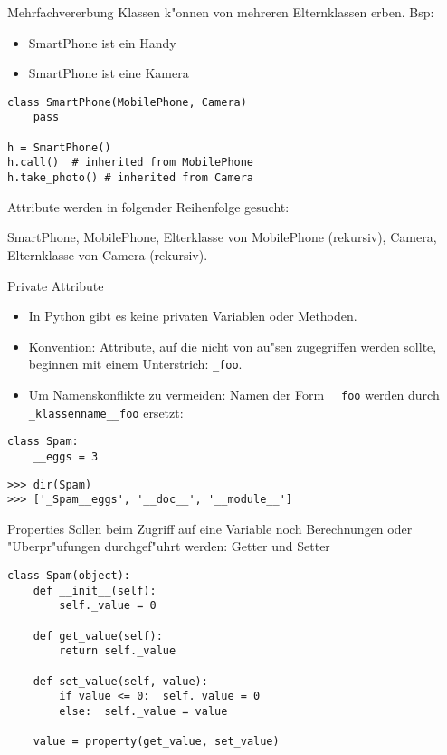 \begin{frame}[fragile]{Mehrfachvererbung}
Klassen k"onnen von mehreren Elternklassen erben. Bsp:
\begin{itemize}
\item SmartPhone ist ein Handy
\item SmartPhone ist eine Kamera
\end{itemize}
\begin{lstlisting}[style=Python]
class SmartPhone(MobilePhone, Camera)
    pass

h = SmartPhone()
h.call()  # inherited from MobilePhone
h.take_photo() # inherited from Camera
\end{lstlisting}
Attribute werden in folgender Reihenfolge gesucht:

SmartPhone, MobilePhone, Elterklasse von MobilePhone (rekursiv), Camera, Elternklasse von Camera (rekursiv).
\end{frame}

\begin{frame}[fragile]{Private Attribute}
\begin{itemize}
\item In Python gibt es keine privaten Variablen oder Methoden. 
\item \alert{Konvention:} Attribute, auf die nicht von au"sen zugegriffen werden sollte, beginnen mit einem Unterstrich: \lstinline{_foo}.
\item Um Namenskonflikte zu vermeiden: Namen der Form \lstinline{__foo} werden durch \lstinline{_klassenname__foo} ersetzt:
\end{itemize}
\begin{lstlisting}[style=Python]
class Spam:
    __eggs = 3
\end{lstlisting}
\begin{lstlisting}[style=Shell]
>>> dir(Spam)
>>> ['_Spam__eggs', '__doc__', '__module__']
\end{lstlisting}
\end{frame}

\begin{frame}[fragile]{Properties}
Sollen beim Zugriff auf eine Variable noch Berechnungen oder "Uberpr"ufungen durchgef"uhrt werden: \alert{Getter} und \alert{Setter}
\begin{lstlisting}[style=Python]
class Spam(object):
    def __init__(self):
        self._value = 0
    
    def get_value(self):
        return self._value

    def set_value(self, value):
        if value <= 0:  self._value = 0
        else:  self._value = value

    value = property(get_value, set_value)
\end{lstlisting}
\end{frame}

